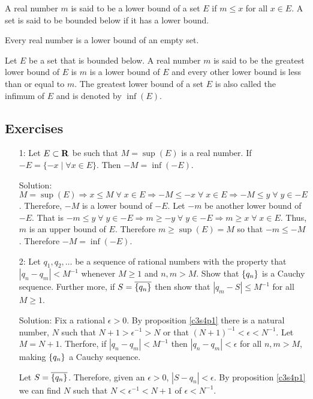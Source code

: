 \begin{defn}\label{c4s5d3}
A real number $m$ is said to be a lower bound of a set $E$ if $m \le x$
for all $x \in E$. A set is said to be bounded below if it has a lower 
bound.
\end{defn}

\begin{rem}
Every real number is a lower bound of an empty set.
\end{rem}

\begin{defn}\label{c4s5d4}
Let $E$ be a set that is bounded below. A real number $m$ is said to be
the greatest lower bound of $E$ is $m$ is a lower bound of $E$ and every
other lower bound is less than or equal to $m$. The greatest lower bound
of a set $E$ is also called the infimum of $E$ and is denoted by $\inf(E)$.
\end{defn}

\subsection{Exercises}
\begin{enumerate}
\item[1:] Let $E \subset \mathbf{R}$ be such that $M = \sup(E)$ is a real 
number. If $-E = \{-x \;|\; \forall x  \in E\}$. Then $-M = \inf(-E)$.
\item[Solution:] $M = \sup(E) \Rightarrow x \le M \;\forall\; x \in E
\Rightarrow -M \le -x \;\forall\; x \in E \Rightarrow -M \le y \;\forall\;
y \in -E$. Therefore, $-M$ is a lower bound of $-E$. Let $-m$ be another
lower bound of $-E$. That is $-m \le y \;\forall\; y \in -E \Rightarrow
m \ge -y \;\forall\; y \in -E \Rightarrow m \ge x \;\forall\; x \in E$.
Thus, $m$ is an upper bound of $E$. Therefore $m \ge \sup(E) = M$ so that
$-m \le -M$. Therefore $-M = \inf(-E)$.

\item[2:] Let $q_1, q_2, \ldots$ be a sequence of rational numbers with
the property that $|q_n - q_m| < M^{-1}$ whenever $M \ge 1$ and $n, m > M$.
Show that $\{q_n\}$ is a Cauchy sequence. Further more, if $S = 
\overline{\{q_n\}}$ then show that $|q_m - S| \le M^{-1}$ for all
$M \ge 1$.
\item[Solution:] Fix a rational $\epsilon > 0$. By proposition \ref{c3s4p1}
there is a natural number, $N$ such that $N + 1 > \epsilon^{-1} > N$ or 
that $(N+1)^{-1} < \epsilon < N^{-1}$. Let $M = N+1$. Therfore, if 
$|q_n - q_m| < M^{-1}$ then $|q_n - q_m| < \epsilon$ for all $n, m > M$,
making $\{q_n\}$ a Cauchy sequence.

Let $S = \overline{\{q_n\}}$. Therefore, given an $\epsilon > 0$, $|
S - q_n| < \epsilon$. By proposition \ref{c3s4p1} we can find $N$ such that
$N < \epsilon^{-1} < N + 1$ of $\epsilon < N^{-1}$.
\end{enumerate}

